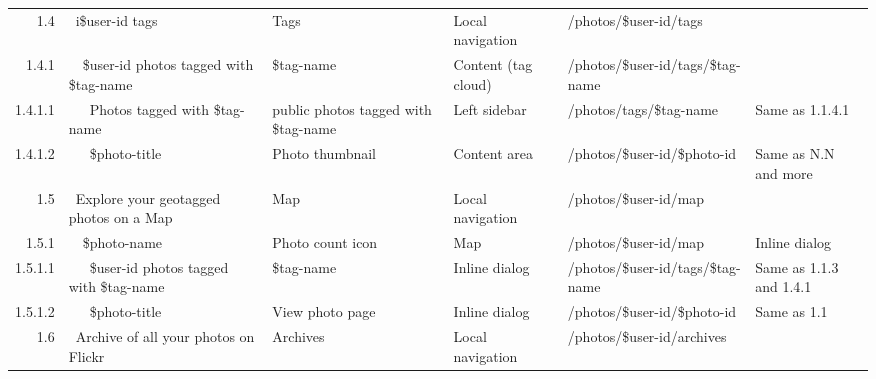\documentclass[12pt,a4paper]{article}
\begin{document}
\begin{landscape}
\begin{table}[h!b!p!]
\begin{center}
\begin{tiny}
\begin{tabular}{r|l|l|l|l|p{3cm}}
              1.4 &
              ~i\$user-id tags &
              Tags &
              Local navigation &
              /photos/\$user-id/tags &
              \\

                1.4.1 &
                ~~\$user-id photos tagged with \$tag-name &
                \$tag-name &
                Content (tag cloud) &
                /photos/\$user-id/tags/\$tag-name &
                \\

                  1.4.1.1 &
                  ~~~Photos tagged with \$tag-name &
                  public photos tagged with \$tag-name &
                  Left sidebar &
                  /photos/tags/\$tag-name &
                  Same as 1.1.4.1 \\

                  1.4.1.2 &
                  ~~~\$photo-title &
                  Photo thumbnail &
                  Content area &
                  /photos/\$user-id/\$photo-id &
                  Same as N.N and more\\

              1.5 &
              ~Explore your geotagged photos on a Map &
              Map &
              Local navigation &
              /photos/\$user-id/map &
              \\

                1.5.1 &
                ~~\$photo-name &
                Photo count icon &
                Map &
                /photos/\$user-id/map &
                Inline dialog\\

                  1.5.1.1 &
                  ~~~\$user-id photos tagged with \$tag-name &
                  \$tag-name &
                  Inline dialog &
                  /photos/\$user-id/tags/\$tag-name &
                  Same as 1.1.3 and 1.4.1\\

                  1.5.1.2 &
                  ~~~\$photo-title &
                  View photo page &
                  Inline dialog &
                  /photos/\$user-id/\$photo-id &
                  Same as 1.1 \\

              1.6 &
              ~Archive of all your photos on Flickr &
              Archives &
              Local navigation &
              /photos/\$user-id/archives &
              \\


\end{tabular}
\end{tiny}
\end{center}
\end{table}
\end{landscape}
\end{document}
